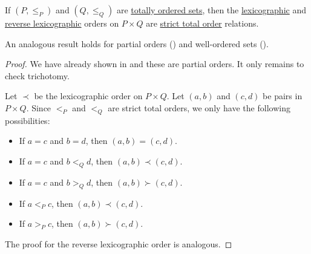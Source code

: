 \begin{proposition}\label{thm:total_lexicographic_order_is_total_order}
  If \( (P, \leq_P) \) and \( (Q, \leq_Q) \) are \hyperref[def:totally_ordered_set]{totally ordered sets}, then the \hyperref[eq:def:lexicographic_order]{lexicographic} and \hyperref[eq:def:lexicographic_order/reverse]{reverse lexicographic} orders on \( P \times Q \) are \hyperref[def:totally_ordered_set]{strict total order} relations.
\end{proposition}
\begin{comments}
  \item An analogous result holds for partial orders () and well-ordered sets ().
\end{comments}
\begin{proof}
  We have already shown in  and these are partial orders. It only remains to check trichotomy.

   Let \( \prec \) be the lexicographic order on \( P \times Q \). Let \( (a, b) \) and \( (c, d) \) be pairs in \( P \times Q \). Since \( <_P \) and \( <_Q \) are strict total orders, we only have the following possibilities:
  \begin{itemize}
    \item If \( a = c \) and \( b = d \), then \( (a, b) = (c, d) \).
    \item If \( a = c \) and \( b <_Q d \), then \( (a, b) \prec (c, d) \).
    \item If \( a = c \) and \( b >_Q d \), then \( (a, b) \succ (c, d) \).
    \item If \( a <_P c \), then \( (a, b) \prec (c, d) \).
    \item If \( a >_P c \), then \( (a, b) \succ (c, d) \).
  \end{itemize}

  The proof for the reverse lexicographic order is analogous.
\end{proof}

